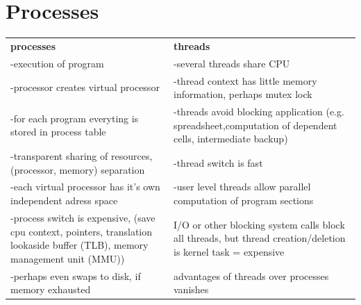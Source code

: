 \chapter{Processes}
\begin{tabular}{p{7cm} p{7cm}}
\textbf{processes}			&\textbf{threads}\\
-execution of program			&-several threads share CPU\\
-processor creates virtual processor	&-thread context has little memory information, perhaps mutex lock\\
-for each program everyting is stored in process table	&-threads avoid blocking application (e.g. spreadsheet,computation of dependent cells, intermediate backup)\\
-transparent sharing of resources,(processor, memory) separation&-thread switch is fast\\
-each virtual processor has it's own independent adress space&-user level threads allow parallel computation of program sections\\
-process switch is expensive, (save cpu context, pointers, translation lookaside buffer (TLB), memory management unit (MMU))&I/O or other blocking system calls block all threads, but thread creation/deletion is kernel task = expensive \\
-perhaps even swaps to disk, if memory exhausted& advantages of threads over processes vanishes\\
\end{tabular}

